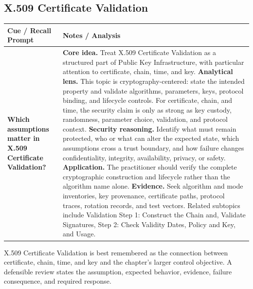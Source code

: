 \documentclass[11pt]{article}
\newcommand{\CornellHeader}{%
\rowcolor{Navy}\color{white}\bfseries Cue / Recall Prompt & \color{white}\bfseries Notes / Analysis\\\hline}
\newcommand{\CornellRow}[2]{%
\cellcolor{CueGray}\RaggedRight\textbf{#1} & \RaggedRight #2\\\hline}
\begin{document}
\subsection*{X.509 Certificate Validation}
\begin{longtable}{>{\RaggedRight\arraybackslash}p{}|>{\RaggedRight\arraybackslash}p{}}
\CornellHeader
\CornellRow{Which assumptions matter in X.509 Certificate Validation?}{\textbf{Core idea.} Treat X.509 Certificate Validation as a structured part of Public Key Infrastructure, with particular attention to certificate, chain, time, and key. \textbf{Analytical lens.} This topic is cryptography-centered: state the intended property and validate algorithms, parameters, keys, protocol binding, and lifecycle controls. For certificate, chain, and time, the security claim is only as strong as key custody, randomness, parameter choice, validation, and protocol context. \textbf{Security reasoning.} Identify what must remain protected, who or what can alter the expected state, which assumptions cross a trust boundary, and how failure changes confidentiality, integrity, availability, privacy, or safety. \textbf{Application.} The practitioner should verify the complete cryptographic construction and lifecycle rather than the algorithm name alone. \textbf{Evidence.} Seek algorithm and mode inventories, key provenance, certificate paths, protocol traces, rotation records, and test vectors. Related subtopics include Validation Step 1: Construct the Chain and, Validate Signatures, Step 2: Check Validity Dates, Policy and Key, and Usage.}
\end{longtable}
\begin{topicsummary}
X.509 Certificate Validation is best remembered as the connection between certificate, chain, time, and key and the chapter's larger control objective. A defensible review states the assumption, expected behavior, evidence, failure consequence, and required response.
\end{topicsummary}
\end{document}
